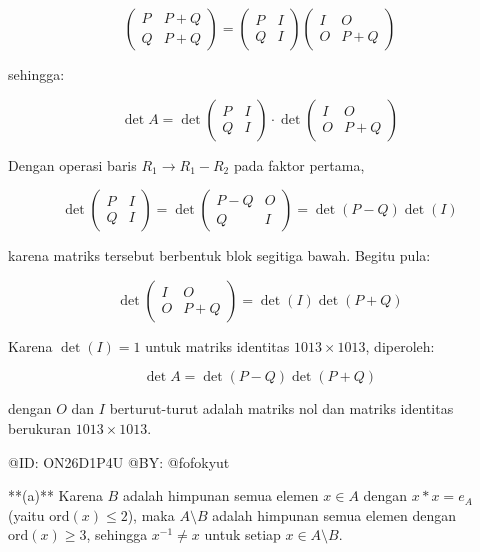 $$
\begin{pmatrix} P & P+Q \\ Q & P+Q \end{pmatrix} = \begin{pmatrix} P & I \\ Q & I \end{pmatrix}\begin{pmatrix} I & O \\ O & P+Q \end{pmatrix}
$$

sehingga:

$$
\det A = \det\begin{pmatrix} P & I \\ Q & I \end{pmatrix} \cdot \det\begin{pmatrix} I & O \\ O & P+Q \end{pmatrix}
$$

Dengan operasi baris $R_1 \to R_1 - R_2$ pada faktor pertama,

$$
\det\begin{pmatrix} P & I \\ Q & I \end{pmatrix} = \det\begin{pmatrix} P-Q & O \\ Q & I \end{pmatrix} = \det(P-Q)\det(I)
$$

karena matriks tersebut berbentuk blok segitiga bawah. Begitu pula:

$$
\det\begin{pmatrix} I & O \\ O & P+Q \end{pmatrix} = \det(I)\det(P+Q)
$$

Karena $\det(I) = 1$ untuk matriks identitas $1013 \times 1013$, diperoleh:

$$
\det A = \det(P-Q)\det(P+Q)
$$

dengan $O$ dan $I$ berturut-turut adalah matriks nol dan matriks identitas berukuran $1013 \times 1013$.










@ID: ON26D1P4U
@BY: @fofokyut

**(a)** Karena $B$ adalah himpunan semua elemen $x \in A$ dengan $x*x=e_A$ (yaitu $\text{ord}(x) \le 2$), maka $A \setminus B$ adalah himpunan semua elemen dengan $\text{ord}(x) \ge 3$, sehingga $x^{-1} \ne x$ untuk setiap $x \in A\setminus B$.

